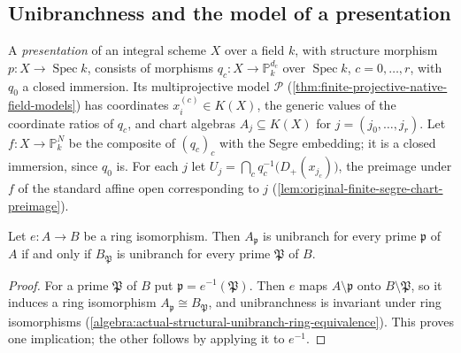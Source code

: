 \subsection{Unibranchness and the model of a presentation}\label{subsec:var-unibranch-presentation}

A \emph{presentation} of an integral scheme $X$ over a field $k$, with structure morphism
$p\colon X\to\operatorname{Spec}k$, consists of morphisms $q_c\colon X\to\mathbb P^{d_c}_k$ over
$\operatorname{Spec}k$, $c=0,\dots,r$, with $q_0$ a closed immersion. Its multiprojective model
$\mathcal P$ (\ref{thm:finite-projective-native-field-models}) has coordinates
$x^{(c)}_i\in K(X)$, the generic values of the coordinate ratios of $q_c$, and chart algebras
$A_j\subseteq K(X)$ for $j=(j_0,\dots,j_r)$. Let $f\colon X\to\mathbb P^N_k$ be the composite of
$(q_c)_c$ with the Segre embedding; it is a closed immersion, since $q_0$ is. For each $j$ let
$U_j=\bigcap_c q_c^{-1}\bigl(D_+(x_{j_c})\bigr)$, the preimage under $f$ of the standard affine
open corresponding to $j$ (\ref{lem:original-finite-segre-chart-preimage}).

\begin{lemma}\label{lem:var-unibranch-localizations-iso}
\leanok
{}
Let $e\colon A\to B$ be a ring isomorphism. Then $A_{\mathfrak p}$ is unibranch for every prime
$\mathfrak p$ of $A$ if and only if $B_{\mathfrak P}$ is unibranch for every prime $\mathfrak P$
of $B$.
\end{lemma}

\begin{proof}
For a prime $\mathfrak P$ of $B$ put $\mathfrak p=e^{-1}(\mathfrak P)$. Then $e$ maps
$A\setminus\mathfrak p$ onto $B\setminus\mathfrak P$, so it induces a ring isomorphism
$A_{\mathfrak p}\cong B_{\mathfrak P}$, and unibranchness is invariant under ring isomorphisms
(\ref{algebra:actual-structural-unibranch-ring-equivalence}). This proves one implication; the
other follows by applying it to $e^{-1}$.
\end{proof}

